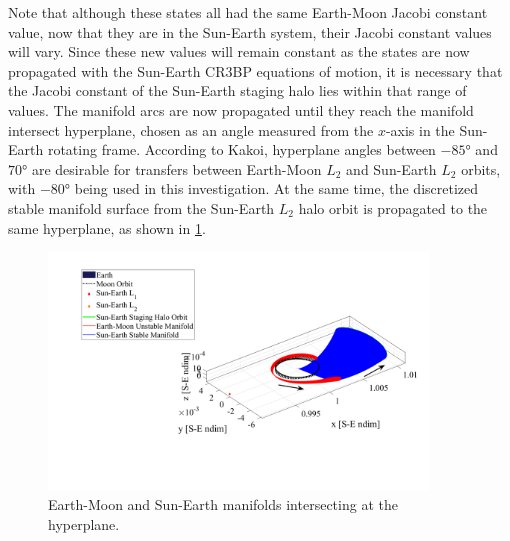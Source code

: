 Note that although these states all had the same Earth-Moon Jacobi constant
value, now that they are in the Sun-Earth system, their Jacobi constant values will vary. Since
these new values will remain constant as the states are now propagated with the Sun-Earth CR3BP
equations of motion, it is necessary that the Jacobi constant of the Sun-Earth staging halo lies
within that range of values. The manifold arcs are now propagated until they reach the manifold
intersect hyperplane, chosen as an angle measured from the $x$-axis in the Sun-Earth rotating
frame. According to Kakoi, hyperplane angles between $-\ang{85}$ and $\ang{70}$ are desirable for
transfers between Earth-Moon $L_{2}$ and Sun-Earth $L_{2}$ orbits, with $\ang{-80}$ being used in
this investigation\cite{Kakoi:2015}. At the same time, the discretized stable manifold surface from
the Sun-Earth $L_{2}$ halo orbit is propagated to the same hyperplane, as shown in
\cref{fig:hyperplane}.

\begin{figure}[ht]
    \centering
    \includegraphics[width=0.9\textwidth]{figures/Hyperplane.pdf}
    \caption{Earth-Moon and Sun-Earth manifolds intersecting at the hyperplane.}
    \label{fig:hyperplane}
\end{figure}

